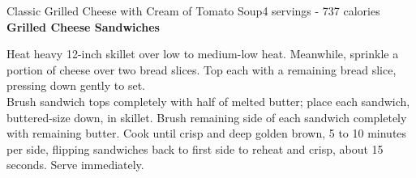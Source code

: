 \begin{recipe}{Classic Grilled Cheese with Cream of Tomato Soup}{4 servings - 737 calories}
\textbf{Grilled Cheese Sandwiches}

Heat heavy 12-inch skillet over low to medium-low heat. Meanwhile, sprinkle a portion of cheese over two bread slices. Top each with a remaining bread slice, pressing down gently to set.\\

Brush sandwich tops completely with half of melted butter; place each sandwich, buttered-size down, in skillet. Brush remaining side of each sandwich completely with remaining butter. Cook until crisp and deep golden brown, 5 to 10 minutes per side, flipping sandwiches back to first side to reheat and crisp, about 15 seconds. Serve immediately.

\end{recipe}